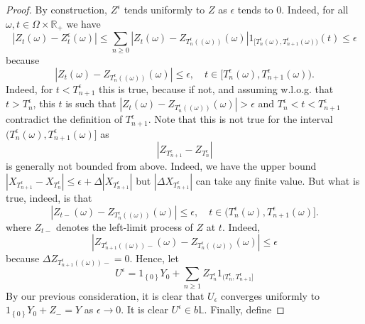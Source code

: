 \documentclass[11pt,a4paper,twoside,openany]{report}
\theoremstyle{plain} %
\theoremstyle{definition} %
\theoremstyle{remark} %
\begin{document}
\begin{proof}
 By construction, \(Z^{\epsilon}\) tends uniformly to \(Z\) as \(\epsilon\) tends to \(0\). Indeed, for all \(\omega,t\in\Omega\times\mathbb{R}_+\) we have 
    \begin{equation}\label{eq:epsilon approximants of cadlag Z}
        |Z_t(\omega)-Z_t^{\epsilon}(\omega)|\leq\sum_{n\geq 0}|Z_{t}(\omega)-Z_{T_n^{\epsilon}((\omega))}(\omega)|1_{[T_{n}^{\epsilon}(\omega),T_{n+1}^{\epsilon}(\omega))}(t)\leq\epsilon
    \end{equation}
    because 
    \begin{equation}
        |Z_{t}(\omega)-Z_{T_n^{\epsilon}((\omega))}(\omega)|\leq\epsilon,\quad t\in[T_{n}^{\epsilon}(\omega),T_{n+1}^{\epsilon}(\omega)).
    \end{equation}
 Indeed, for \(t<T_{n+1}^{\epsilon}\) this is true, because if not, and assuming w.l.o.g. that \(t>T_{n}^{\epsilon}\), this \(t\) is such that \(|Z_{t}(\omega)-Z_{T_n^{\epsilon}((\omega))}(\omega)|>\epsilon\) and \(T_{n}^{\epsilon}<t<T_{n+1}^{\epsilon}\) contradict the definition of \(T_{n+1}^{\epsilon}\). Note that this is not true for the interval \((T_{n}^{\epsilon}(\omega),T_{n+1}^{\epsilon}(\omega)]\) as 
     \begin{equation}
        |Z_{T_{n+1}^{\epsilon}}-Z_{T_n^{\epsilon}}|
    \end{equation}
    is generally not  bounded from above. Indeed, we have the upper bound \(|X_{T_{n+1}^{\epsilon}}-X_{T_n^{\epsilon}}|\leq\epsilon+\Delta |X_{T_{n+1}^{\epsilon}}|\) but \(|\Delta X_{T_{n+1}^{\epsilon}}|\) can take any finite value. 
    But what is true, indeed, is that 
  \begin{equation}
        |Z_{t-}(\omega)-Z_{T_n^{\epsilon}((\omega))}(\omega)|\leq\epsilon,\quad t\in(T_{n}^{\epsilon}(\omega),T_{n+1}^{\epsilon}(\omega)].
    \end{equation}
    where \(Z_{t-}\) denotes the left-limit process of \(Z\) at \(t\). Indeed,
    \begin{equation}
      |Z_{T_{n+1}^{\epsilon}((\omega))-}(\omega)-Z_{T_n^{\epsilon}((\omega))}(\omega)|  \leq \epsilon
    \end{equation}
    because \(\Delta Z_{T_{n+1}^{\epsilon}((\omega))-}=0\). Hence, let 
    \begin{equation}
        U^{\epsilon}=1_{\left\{0\right\}}Y_0+\sum_{n\geq 1} Z_{T_n^{\epsilon}}1_{(T_{n}^{\epsilon},T_{n+1}^{\epsilon}]} 
    \end{equation}
    By our previous consideration, it is clear that \(U_\epsilon\) converges uniformly to \(1_{\left\{0\right\}}Y_0+Z_{-}=Y\) as \(\epsilon\to 0\). It is clear \(U^{\epsilon}\in b\mathbb{L}\). Finally, define 

\end{proof}
\end{document}
